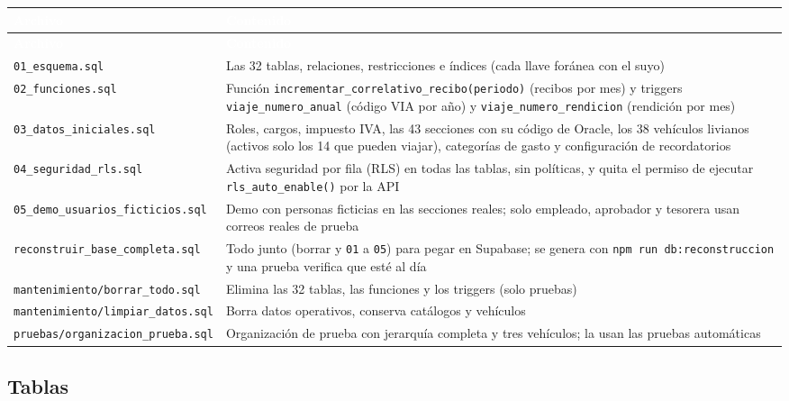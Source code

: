 \documentclass[11pt,letterpaper]{article}
\newcommand{\cabecera}{\rowcolor{maxamPrimario}}
\newcommand{\tth}[1]{\textcolor{white}{\textbf{#1}}}
\newcommand{\code}[1]{\nolinkurl{#1}}
\begin{document}
\begin{xltabular}{\textwidth}{L{5.2cm} Y}
\cabecera \tth{Archivo} & \tth{Contenido} \\
\endfirsthead
\cabecera \tth{Archivo} & \tth{Contenido} \\
\endhead
{} \code{01_esquema.sql} & Las 32 tablas, relaciones, restricciones e índices (cada llave foránea con el suyo) \\
\code{02_funciones.sql} & Función \code{incrementar_correlativo_recibo(periodo)} (recibos por mes) y triggers \code{viaje_numero_anual} (código VIA por año) y \code{viaje_numero_rendicion} (rendición por mes) \\
 \code{03_datos_iniciales.sql} & Roles, cargos, impuesto IVA, las 43 secciones con su código de Oracle, los 38 vehículos livianos (activos solo los 14 que pueden viajar), categorías de gasto y configuración de recordatorios \\
\code{04_seguridad_rls.sql} & Activa seguridad por fila (RLS) en todas las tablas, sin políticas, y quita el permiso de ejecutar \code{rls_auto_enable()} por la API \\
 \code{05_demo_usuarios_ficticios.sql} & Demo con personas ficticias en las secciones reales; solo empleado, aprobador y tesorera usan correos reales de prueba \\
\code{reconstruir_base_completa.sql} & Todo junto (borrar y \code{01} a \code{05}) para pegar en Supabase; se genera con \code{npm run db:reconstruccion} y una prueba verifica que esté al día \\
 \code{mantenimiento/borrar_todo.sql} & Elimina las 32 tablas, las funciones y los triggers (solo pruebas) \\
\code{mantenimiento/limpiar_datos.sql} & Borra datos operativos, conserva catálogos y vehículos \\
 \code{pruebas/organizacion_prueba.sql} & Organización de prueba con jerarquía completa y tres vehículos; la usan las pruebas automáticas \\
\end{xltabular}

\subsection{Tablas}
\end{document}

